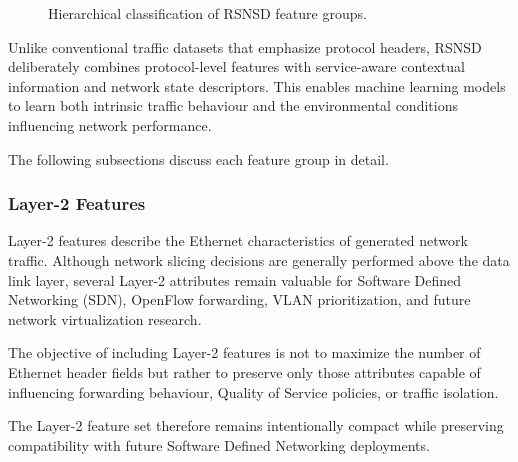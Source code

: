 \documentclass[12pt,a4paper]{article}
\begin{document}
\begin{figure}[H]
	\centering
	\caption{Hierarchical classification of RSNSD feature groups.}
	\label{fig:feature_classification}
\end{figure}

Unlike conventional traffic datasets that emphasize protocol headers, RSNSD deliberately combines protocol-level features with service-aware contextual information and network state descriptors. This enables machine learning models to learn both intrinsic traffic behaviour and the environmental conditions influencing network performance.

The following subsections discuss each feature group in detail.

\subsubsection{Layer-2 Features}

Layer-2 features describe the Ethernet characteristics of generated network traffic. Although network slicing decisions are generally performed above the data link layer, several Layer-2 attributes remain valuable for Software Defined Networking (SDN), OpenFlow forwarding, VLAN prioritization, and future network virtualization research.

The objective of including Layer-2 features is not to maximize the number of Ethernet header fields but rather to preserve only those attributes capable of influencing forwarding behaviour, Quality of Service policies, or traffic isolation.

The Layer-2 feature set therefore remains intentionally compact while preserving compatibility with future Software Defined Networking deployments.
\end{document}
